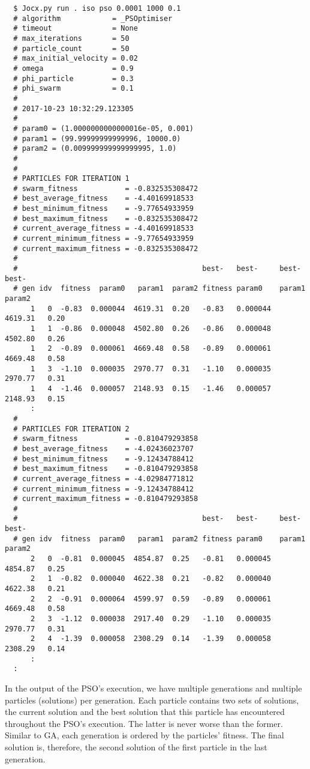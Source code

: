 \documentclass[graybox]{svmult}
\begin{document}
{\small{}\begin{verbatim}
  $ Jocx.py run . iso pso 0.0001 1000 0.1
  # algorithm            = _PSOptimiser
  # timeout              = None
  # max_iterations       = 50
  # particle_count       = 50
  # max_initial_velocity = 0.02
  # omega                = 0.9
  # phi_particle         = 0.3
  # phi_swarm            = 0.1
  #
  # 2017-10-23 10:32:29.123305
  #
  # param0 = (1.0000000000000016e-05, 0.001)
  # param1 = (99.99999999999996, 10000.0)
  # param2 = (0.009999999999999995, 1.0)
  #
  #
  # PARTICLES FOR ITERATION 1
  # swarm_fitness           = -0.832535308472
  # best_average_fitness    = -4.40169918533
  # best_minimum_fitness    = -9.77654933959
  # best_maximum_fitness    = -0.832535308472
  # current_average_fitness = -4.40169918533
  # current_minimum_fitness = -9.77654933959
  # current_maximum_fitness = -0.832535308472
  #
  #                                           best-   best-     best-     best-
  # gen idv  fitness  param0   param1  param2 fitness param0    param1    param2
      1   0  -0.83  0.000044  4619.31  0.20   -0.83   0.000044  4619.31   0.20
      1   1  -0.86  0.000048  4502.80  0.26   -0.86   0.000048  4502.80   0.26
      1   2  -0.89  0.000061  4669.48  0.58   -0.89   0.000061  4669.48   0.58
      1   3  -1.10  0.000035  2970.77  0.31   -1.10   0.000035  2970.77   0.31
      1   4  -1.46  0.000057  2148.93  0.15   -1.46   0.000057  2148.93   0.15
      :
  #
  # PARTICLES FOR ITERATION 2
  # swarm_fitness           = -0.810479293858
  # best_average_fitness    = -4.02436023707
  # best_minimum_fitness    = -9.12434788412
  # best_maximum_fitness    = -0.810479293858
  # current_average_fitness = -4.02984771812
  # current_minimum_fitness = -9.12434788412
  # current_maximum_fitness = -0.810479293858
  #
  #                                           best-   best-     best-     best-
  # gen idv  fitness  param0   param1  param2 fitness param0    param1    param2
      2   0  -0.81  0.000045  4854.87  0.25   -0.81   0.000045  4854.87   0.25
      2   1  -0.82  0.000040  4622.38  0.21   -0.82   0.000040  4622.38   0.21
      2   2  -0.91  0.000064  4599.97  0.59   -0.89   0.000061  4669.48   0.58
      2   3  -1.12  0.000038  2917.40  0.29   -1.10   0.000035  2970.77   0.31
      2   4  -1.39  0.000058  2308.29  0.14   -1.39   0.000058  2308.29   0.14
      :
  :
\end{verbatim}}

In the output of the PSO's execution, we have multiple generations and multiple particles (solutions) per generation. Each particle contains two sets of solutions, the current solution and the best solution that this particle has encountered throughout the PSO's execution. The latter is never worse than the former. Similar to GA, each generation is ordered by the particles' fitness. The final solution is, therefore, the second solution of the first particle in the last generation.
\end{document}
